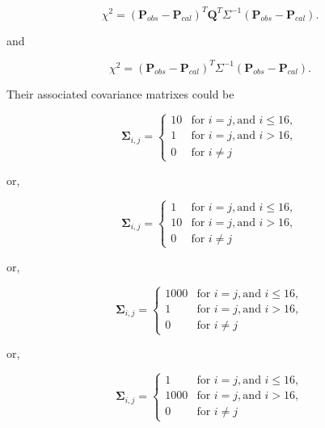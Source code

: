 \begin{equation}
\label{eq:fitnessChi2}
\chi^{2} = (\mathbf{P}_{obs} - \mathbf{P}_{cal})^T\mathbf{Q}^T\Sigma^{-1}(\mathbf{P}_{obs} - \mathbf{P}_{cal}).
\end{equation}

and

\begin{equation}
\label{eq:fitnessChi3}
\chi^{2} = (\mathbf{P}_{obs} - \mathbf{P}_{cal})^T\Sigma^{-1}(\mathbf{P}_{obs} - \mathbf{P}_{cal}).
\end{equation}

Their associated covariance matrixes could be

\begin{equation}
\label{eq:covariance2}
\mathbf{\Sigma}_{i,j} =
\left\{
    \begin{array}{ll}
    10 & \mbox{for } i=j, \mbox{and } i\leq16, \\
    1 & \mbox{for } i=j, \mbox{and } i>16, \\
    0 & \mbox{for } i \neq j
    \end{array} \right.
\end{equation}

or,

\begin{equation}
\label{eq:covariance3}
\mathbf{\Sigma}_{i,j} =
\left\{
    \begin{array}{ll}
    1 & \mbox{for } i=j, \mbox{and } i\leq16, \\
    10 & \mbox{for } i=j, \mbox{and } i>16, \\
    0 & \mbox{for } i \neq j
    \end{array} \right.
\end{equation}

or,

\begin{equation}
\label{eq:covariance4}
\mathbf{\Sigma}_{i,j} =
\left\{
    \begin{array}{ll}
    1000 & \mbox{for } i=j, \mbox{and } i\leq16, \\
    1 & \mbox{for } i=j, \mbox{and } i>16, \\
    0 & \mbox{for } i \neq j
    \end{array} \right.
\end{equation}

or,

\begin{equation}
\label{eq:covariance5}
\mathbf{\Sigma}_{i,j} =
\left\{
    \begin{array}{ll}
    1 & \mbox{for } i=j, \mbox{and } i\leq16, \\
    1000 & \mbox{for } i=j, \mbox{and } i>16, \\
    0 & \mbox{for } i \neq j
    \end{array} \right.
\end{equation}


